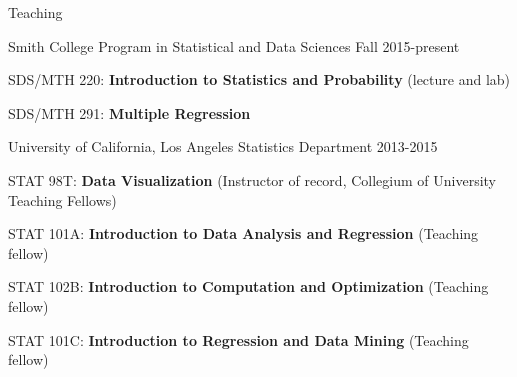 \documentclass{resume} %
\begin{document}

\begin{rSection}{Teaching}

\begin{rSubsection}{Smith College }{ Program in Statistical and Data Sciences }{Fall 2015-present}{}
\item SDS/MTH 220: \textbf{Introduction to Statistics and Probability} (lecture and lab)
\item SDS/MTH 291: \textbf{Multiple Regression}
\end{rSubsection}


\begin{rSubsection}{University of California, Los Angeles }{ Statistics Department }{2013-2015}{}
\item STAT 98T: \textbf{Data Visualization }(Instructor of record, Collegium of University Teaching Fellows)
 \item STAT 101A: \textbf{Introduction to Data Analysis and Regression} (Teaching fellow)
\item STAT 102B: \textbf{Introduction to Computation and Optimization} (Teaching fellow)
\item  STAT 101C: \textbf{Introduction to Regression and Data Mining} (Teaching fellow)
\end{rSubsection}


\end{rSection}
\end{document}
